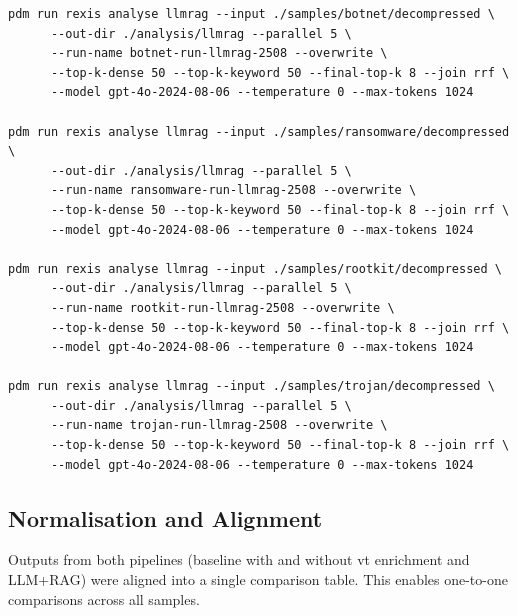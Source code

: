 \begin{verbatim}
pdm run rexis analyse llmrag --input ./samples/botnet/decompressed \
      --out-dir ./analysis/llmrag --parallel 5 \
      --run-name botnet-run-llmrag-2508 --overwrite \
      --top-k-dense 50 --top-k-keyword 50 --final-top-k 8 --join rrf \
      --model gpt-4o-2024-08-06 --temperature 0 --max-tokens 1024

pdm run rexis analyse llmrag --input ./samples/ransomware/decompressed \
      --out-dir ./analysis/llmrag --parallel 5 \
      --run-name ransomware-run-llmrag-2508 --overwrite \
      --top-k-dense 50 --top-k-keyword 50 --final-top-k 8 --join rrf \
      --model gpt-4o-2024-08-06 --temperature 0 --max-tokens 1024

pdm run rexis analyse llmrag --input ./samples/rootkit/decompressed \
      --out-dir ./analysis/llmrag --parallel 5 \
      --run-name rootkit-run-llmrag-2508 --overwrite \
      --top-k-dense 50 --top-k-keyword 50 --final-top-k 8 --join rrf \
      --model gpt-4o-2024-08-06 --temperature 0 --max-tokens 1024

pdm run rexis analyse llmrag --input ./samples/trojan/decompressed \
      --out-dir ./analysis/llmrag --parallel 5 \
      --run-name trojan-run-llmrag-2508 --overwrite \
      --top-k-dense 50 --top-k-keyword 50 --final-top-k 8 --join rrf \
      --model gpt-4o-2024-08-06 --temperature 0 --max-tokens 1024
\end{verbatim}

\subsection{Normalisation and Alignment}\label{subsec:NormalizationAlignment}
Outputs from both pipelines (baseline with and without \gls{vt} enrichment and LLM+RAG) were
aligned into a single comparison table. This enables one-to-one comparisons across all samples.

